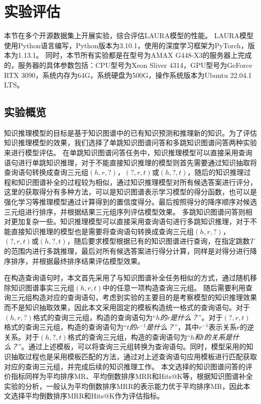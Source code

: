 \documentclass[algorithmlist, AutoFakeBold, AutoFakeSlant, figurelist, tablelist, nomlist, engineering]{seuthesix}
\begin{document}
\section{实验评估}
本节在多个开源数据集上开展实验，综合评估LAURA模型的性能。
LAURA模型使用Python语言编写，Python版本为3.10.1，使用的深度学习框架为PyTorch，版本为1.13.1。
同时，本节所有实验都是在型号为AMAX G448-X3的服务器上完成的，服务器的具体参数包括：CPU型号为Xeon Sliver 4314，GPU型号为GeForce RTX 3090，系统内存为64G，系统硬盘为500G，操作系统版本为Ubuntu 22.04.1 LTS。

\subsection{实验概览}
知识推理模型的目标是基于知识图谱中的已有知识预测和推理新的知识。为了评估知识推理模型的效果，我们选择了单跳知识图谱问答和多跳知识图谱问答两种实验来进行模型评估。
在单跳知识图谱问答任务中，知识推理模型可以直接采用查询语句进行单跳知识推理，对于不能直接知识推理的模型则首先需要通过知识抽取将查询语句转换成查询三元组$(h, r, ?)$，$(?, r, t)$或$(h, ?, t)$，随后的知识推理过程和知识图谱补全的过程较为相似，通过知识推理模型对所有候选答案进行评分，这里的获取得分有多种方法，可以是知识图谱表示学习模型的得分函数，也可以是强化学习等推理模型通过计算得到的置信度得分。最后按照得分的降序顺序对候选三元组进行排序，并根据结果三元组序列评估模型效果。
多跳知识图谱问答则相对更加复杂一些。知识推理模型可以直接采用查询语句进行多跳知识推理，对于不能直接知识推理的模型也是需要将查询语句转换成查询三元组$(h, r, ?)$，$(?, r, t)$或$(h, ?, t)$，随后要求模型根据已有的知识图谱进行查询，在指定跳数$T$的范围内进行多跳推理，最后对所有候选答案进行得分计算，同样是对得分进行降序排序，并根据最终排序结果评估模型效果。

在构造查询语句时，本文首先采用了与知识图谱补全任务相似的方式，通过随机移除知识图谱事实三元组$(h, r, t)$中的任意一项构造查询三元组。
随后需要利用查询三元组构造对应的查询语句，考虑到实验的主要目的是考察模型的知识推理效果而不是知识抽取效果，因此本文采用固定的模板构造统一格式的查询语句。对于$(h, r, ?)$格式的查询三元组，构造的查询语句为“\textit{$h$的$r$是什么？}”。对于$(?, r, t)$格式的查询三元组，构造的查询语句为“\textit{$t$的$r^{-1}$是什么？}”，其中$r^{-1}$表示关系$r$的逆关系。对于$(h, ?, t)$格式的查询三元组，构造的查询语句为“\textit{$h$和$t$的关系是什么？}”。通过上述模板，可以将查询三元组转换为查询语句。同时，模型采用的知识抽取过程也是采用模板匹配的方法，通过对上述查询语句应用模板进行匹配获取对应的查询三元组，并完成后续的知识推理工作。
本文选择的知识图谱问答的评价指标同样为平均排序MR、平均倒数排序MRR和Hits@K等，根据知识图谱补全实验的分析，一般认为平均倒数排序MRR的表示能力优于平均排序MR，因此本文选择平均倒数排序MRR和Hits@K作为评估指标。
\end{document}
